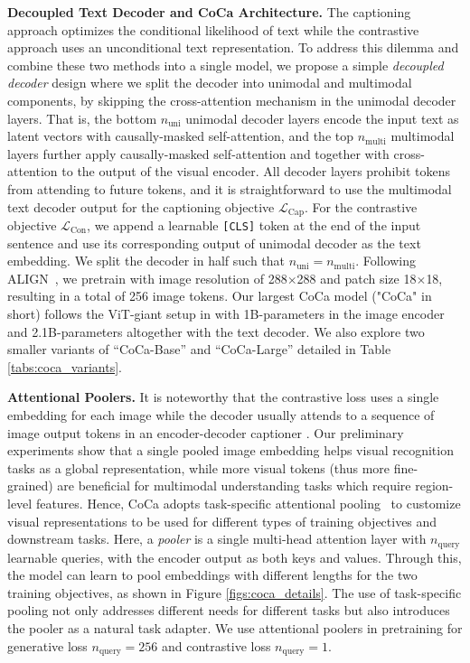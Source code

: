 \textbf{Decoupled Text Decoder and CoCa Architecture.}
The captioning approach optimizes the conditional likelihood of text while the contrastive approach uses an unconditional text representation.
To address this dilemma and combine these two methods into a single model,
we propose a simple \textit{decoupled decoder} design where we split the decoder into unimodal and multimodal components,
by skipping the cross-attention mechanism in the unimodal decoder layers.
That is,
the bottom \(n_{\text{uni}}\) unimodal decoder layers encode the input text as latent vectors with causally-masked self-attention,
and the top \(n_{\text{multi}}\) multimodal layers further apply causally-masked self-attention and together with cross-attention to the output of the visual encoder.
All decoder layers prohibit tokens from attending to future tokens,
and it is straightforward to use the multimodal text decoder output for the captioning objective $\mathcal{L}_{\text{Cap}}$.
For the contrastive objective $\mathcal{L}_{\text{Con}}$,
we append a learnable \verb+[CLS]+ token at the end of the input sentence and use its corresponding output of unimodal decoder as the text embedding. We split the decoder in half such that $n_{\text{uni}}=n_{\text{multi}}$. Following ALIGN~\cite{jia2021scaling}, we pretrain with image resolution of 288$\times$288 and patch size 18\(\times\)18, resulting in a total of 256 image tokens.
Our largest CoCa model ("CoCa" in short) follows the ViT-giant setup in \cite{zhai2021scaling} with 1B-parameters in the image encoder and 2.1B-parameters altogether with the text decoder.
We also explore two smaller variants of ``CoCa-Base'' and ``CoCa-Large'' detailed in Table \ref{tabs:coca_variants}.



\textbf{Attentional Poolers.}
It is noteworthy that the contrastive loss uses a single embedding for each image while the decoder usually attends to a sequence of image output tokens in an encoder-decoder captioner \cite{wang2021simvlm}.
Our preliminary experiments show that a single pooled image embedding helps visual recognition tasks as a global representation,
while more visual tokens (thus more fine-grained) are beneficial for multimodal understanding tasks which require region-level features.
Hence,
CoCa adopts task-specific attentional pooling~\cite{lee2019set} to customize visual representations to be used for different types of training objectives and downstream tasks.
Here,
a \textit{pooler} is a single multi-head attention layer with $n_{\text{query}}$ learnable queries,
with the encoder output as both keys and values.
Through this,
the model can learn to pool embeddings with different lengths for the two training objectives, as shown in Figure \ref{figs:coca_details}.
The use of task-specific pooling not only addresses different needs for different tasks but also introduces the pooler as a natural task adapter.
We use attentional poolers in pretraining for generative loss \(n_{\text{query}}=256\) and contrastive loss \(n_{\text{query}}=1\).



